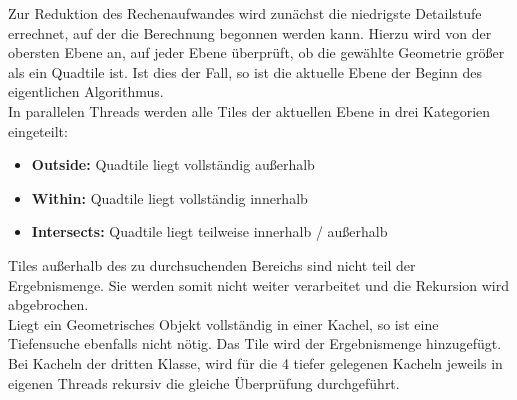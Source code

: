 \documentclass[10pt,conference,compsocconf]{IEEEtran}
\begin{document}
Zur Reduktion des Rechenaufwandes wird zunächst die niedrigste Detailstufe errechnet, auf der die Berechnung begonnen werden kann. Hierzu wird von der obersten Ebene an, auf jeder Ebene überprüft, ob die gewählte Geometrie größer als ein Quadtile ist. Ist dies der Fall, so ist die aktuelle Ebene der Beginn des eigentlichen Algorithmus.\\
In parallelen Threads werden alle Tiles der aktuellen Ebene in drei Kategorien eingeteilt:
\begin{itemize}
	\item \textbf{Outside:} Quadtile liegt vollständig außerhalb
	\item \textbf{Within:} Quadtile liegt vollständig innerhalb
	\item \textbf{Intersects:} Quadtile liegt teilweise innerhalb / außerhalb
\end{itemize}
Tiles außerhalb des zu durchsuchenden Bereichs sind nicht teil der Ergebnismenge. Sie werden somit nicht weiter verarbeitet und die Rekursion wird abgebrochen.\\
Liegt ein Geometrisches Objekt vollständig in einer Kachel, so ist eine Tiefensuche ebenfalls nicht nötig. Das Tile wird der Ergebnismenge hinzugefügt.\\
Bei Kacheln der dritten Klasse, wird für die 4 tiefer gelegenen Kacheln jeweils in eigenen Threads rekursiv die gleiche Überprüfung durchgeführt.\\

%
%	
%
%	
%
%  
\end{document}
